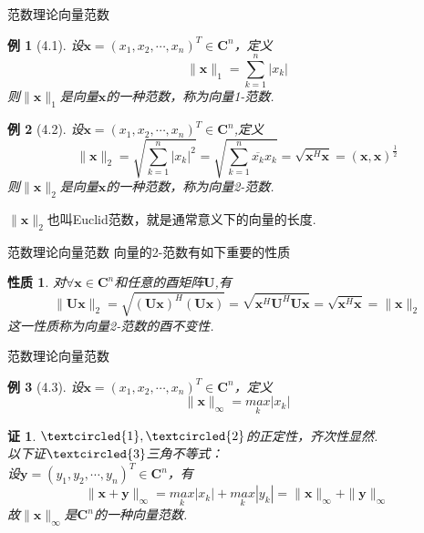 \documentclass{sintefbeamer}[dark]
\newtheorem*{例}{例}
\newtheorem*{证}{证}
\newtheorem*{性质}{性质}
\begin{document}
\begin{frame}{范数理论}{向量范数}
	\begin{例}[4.1]
		设$\bm{x}=(x_{1},x_{2},\cdots,x_{n})^{T}\in\mathbf{C}^{n}$，定义
		$$
		\|\bm{x}\|_{1}=\sum_{k=1}^{n}|x_{k}| 
		$$
		\linebreak
		则$\|\bm{x}\|_{1}$是向量$\bm{x}$的一种范数，称为向量1-范数.
		\end{例}
	\pause
	\begin{例}[4.2]
		设$\bm{x}=(x_{1},x_{2},\cdots,x_{n})^{T}\in\mathbf{C}^{n}$,定义
		$$
		\|\bm{x}\|_{2}=\sqrt{\sum_{k=1}^{n}|x_{k}|^{2}}=\sqrt{\sum_{k=1}^{n}\overline{x_{k}}x_{k}}=\sqrt{\bm{x}^{H}\bm{x}}=(\bm{x},\bm{x})^{\frac{1}{2} } 
		$$
		\linebreak
		则$\|\bm{x}\|_{2}$是向量$\bm{x}$的一种范数，称为向量2-范数.
		\end{例}
	\pause
	$\|\bm{x}\|_{2}$也叫Euclid范数，就是通常意义下的向量的长度.
	\end{frame}

\begin{frame}{范数理论}{向量范数}
	向量的2-范数有如下重要的性质
	\begin{性质}
		对${\forall}\bm{x}\in\mathbf{C}^{n}$和任意的酉矩阵$\bm{U}$,有
		$$
		\|\bm{U}\bm{x}\|_{2}= \sqrt{(\bm{U}\bm{x})^{H}(\bm{U}\bm{x})} =\sqrt{\bm{x}^{H}\bm{U}^{H}\bm{U}\bm{x}}=\sqrt{\bm{x}^{H}\bm{x}}=\|\bm{x}\|_{2}
		$$
		\linebreak
		这一性质称为向量2-范数的酉不变性.
		\end{性质}
\end{frame}


\begin{frame}{范数理论}{向量范数}
	\begin{例}[4.3]
		设$\bm{x}=(x_{1},x_{2},\cdots,x_{n})^{T}\in\mathbf{C}^{n}$，定义
		$$
		\|\bm{x}\|_{\infty }=\underset{k}{max}|x_{k}|
		$$
		\end{例}
	\pause
	\begin{证}
		$\textcircled{1},\textcircled{2}$的正定性，齐次性显然.
		\\
		以下证$\textcircled{3}$三角不等式：
		\\
		设$\bm{y}=(y_{1},y_{2},\cdots,y_{n})^{T}\in\mathbf{C}^{n}$，有
		$$
		\|\bm{x}+\bm{y}\|_{\infty}=\underset{k}{max}|x_{k}|+\underset{k}{max}|y_{k}|=\|\bm{x}\|_{\infty}+\|\bm{y}\|_{\infty}
		$$
		\linebreak
		故$\|\bm{x}\|_{\infty}$是$\mathbf{C}^{n}$的一种向量范数.
		\end{证}
\end{frame}
\end{document}
